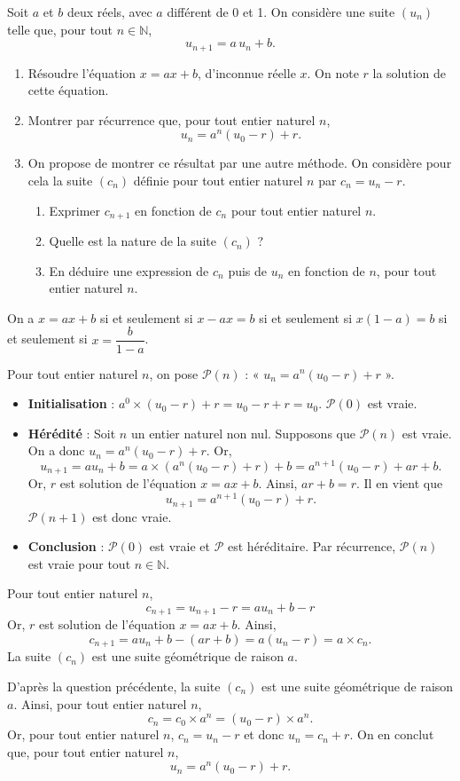 \documentclass[11pt,fleqn]{book} %
\begin{document}
\begin{exercise}[topic=rec01, subtitle={(Suites arithmético-géométriques)}]

 Soit \(a\) et \(b\) deux réels, avec \(a\) différent de 0 et 1. On considère une suite \((u_n)\) telle que, pour tout \(n\in\mathbb{N}\), 
\[u_{n+1}=a\,u_n+b.\]
\begin{enumerate}
\item Résoudre l'équation \(x =ax+b\), d'inconnue réelle \(x\). On note \(r\) la solution de cette équation.
\item Montrer par récurrence que, pour tout entier naturel \(n\),
\[u_n=a^n(u_0-r)+r.\]
\item On propose de montrer ce résultat par une autre méthode. On considère pour cela la suite \((c_n)\) définie pour tout entier naturel \(n\) par \(c_n=u_n-r\).
\begin{enumerate}
\item Exprimer \(c_{n+1}\) en fonction de \(c_n\) pour tout entier naturel \(n\). 
\item Quelle est la nature de la suite \((c_n)\) ?
\item En déduire une expression de \(c_n\) puis de \(u_n\) en fonction de \(n\), pour tout entier naturel \(n\).\end{enumerate}\end{enumerate}\end{exercise}
\begin{solution}On a \(x=ax+b\) si et seulement si \(x-ax=b\) si et seulement si \(x(1-a)=b\) si et seulement si \(x=\dfrac{b}{1-a}\).

Pour tout entier naturel \(n\), on pose \(\mathcal{P}(n)\) : « \(u_n=a^n(u_0-r)+r\) ».
\begin{itemize} \item \textbf{Initialisation} : \(a^0 \times (u_0-r)+r = u_0-r+r=u_0\). \( \mathcal{P}(0) \) est vraie.
\item \textbf{Hérédité} : Soit \(n\) un entier naturel non nul. Supposons que \( \mathcal{P}(n)\) est vraie. On a donc \(u_n=a^n(u_0-r)+r\). Or,
\[u_{n+1}= au_n+b=a \times (a^n(u_0-r)+r) + b = a^{n+1} (u_0-r)+ar+b.\]
Or, \(r\) est solution de l'équation \(x =ax+b\). Ainsi, \(ar+b=r\). Il en vient que
\[u_{n+1}=a^{n+1} (u_0-r)+r.\]
\( \mathcal{P}(n+1)\) est donc vraie.
\item \textbf{Conclusion} : \(\mathcal{P}(0)\) est vraie et \(\mathcal{P}\) est héréditaire. Par récurrence, \(\mathcal{P}(n)\) est vraie pour tout \(n\in\mathbb{N}\).\end{itemize}

Pour tout entier naturel \(n\),
\[c_{n+1}=u_{n+1}-r=au_n+b-r\]
Or, \(r\) est solution de l'équation \(x=ax+b\). Ainsi,
\[c_{n+1}=au_n+b-(ar+b) =a(u_n-r)=a\times c_n.\]
La suite \((c_n)\) est une suite géométrique de raison \(a\).

D'après la question précédente, la suite \((c_n)\) est une suite géométrique de raison \(a\). Ainsi, pour tout entier naturel \(n\),
\[c_n=c_0 \times a^n = (u_0-r) \times a^n.\]
Or, pour tout entier naturel \(n\), \(c_n=u_n-r\) et donc \(u_n=c_n+r\). On en conclut que, pour tout entier naturel \(n\),
\[u_n=a^n(u_0-r)+r.\]\end{solution}
\end{document}
